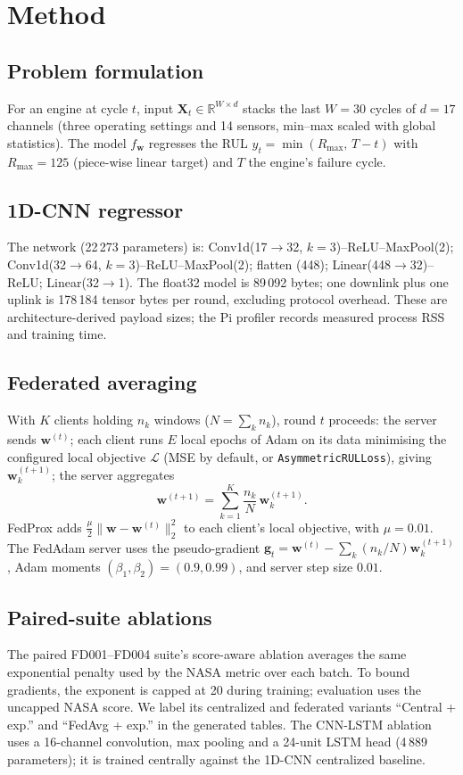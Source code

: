 \section{Method}
\label{sec:method}
\subsection{Problem formulation}
For an engine at cycle $t$, input $\mathbf{X}_t\in\mathbb{R}^{W\times d}$ stacks the last $W{=}30$ cycles of $d{=}17$ channels (three operating settings and 14 sensors, min--max scaled with global statistics). The model $f_{\mathbf{w}}$ regresses the RUL $y_t=\min(R_{\max},\,T-t)$ with $R_{\max}=125$ (piece-wise linear target) and $T$ the engine's failure cycle.

\subsection{1D-CNN regressor}
The network (22\,273 parameters) is: Conv1d(17$\to$32, $k{=}3$)--ReLU--MaxPool(2); Conv1d(32$\to$64, $k{=}3$)--ReLU--MaxPool(2); flatten (448); Linear(448$\to$32)--ReLU; Linear(32$\to$1). The float32 model is 89\,092 bytes; one downlink plus one uplink is 178\,184 tensor bytes per round, excluding protocol overhead. These are architecture-derived payload sizes; the Pi profiler records measured process RSS and training time.

\subsection{Federated averaging}
With $K$ clients holding $n_k$ windows ($N=\sum_k n_k$), round $t$ proceeds: the server sends $\mathbf{w}^{(t)}$; each client runs $E$ local epochs of Adam on its data minimising the configured local objective $\mathcal{L}$ (MSE by default, or \texttt{AsymmetricRULLoss}), giving $\mathbf{w}_k^{(t+1)}$; the server aggregates
\begin{equation}
\mathbf{w}^{(t+1)}=\sum_{k=1}^{K}\frac{n_k}{N}\,\mathbf{w}_k^{(t+1)}.
\end{equation}
FedProx adds $\frac{\mu}{2}\lVert\mathbf{w}-\mathbf{w}^{(t)}\rVert_2^2$ to each client's local objective, with $\mu=0.01$. The FedAdam server uses the pseudo-gradient $\mathbf{g}_t=\mathbf{w}^{(t)}-\sum_k(n_k/N)\mathbf{w}_k^{(t+1)}$, Adam moments $(\beta_1,\beta_2)=(0.9,0.99)$, and server step size $0.01$.

\subsection{Paired-suite ablations}
The paired FD001--FD004 suite's score-aware ablation averages the same exponential penalty used by the NASA metric over each batch. To bound gradients, the exponent is capped at 20 during training; evaluation uses the uncapped NASA score. We label its centralized and federated variants ``Central + exp.'' and ``FedAvg + exp.'' in the generated tables. The CNN-LSTM ablation uses a 16-channel convolution, max pooling and a 24-unit LSTM head (4\,889 parameters); it is trained centrally against the 1D-CNN centralized baseline.

